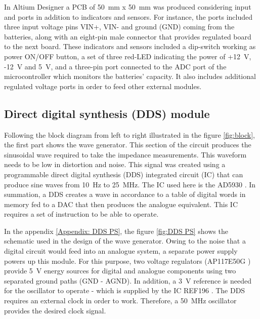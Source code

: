 In Altium Designer a PCB of \SI{50}{\milli\meter} x \SI{50}{\milli\meter} was produced considering input and ports in addition to indicators and sensors. For instance, the ports included three input voltage pins VIN+, VIN- and ground (GND) coming from the batteries, along with an eight-pin male connector that provides regulated board to the next board. These indicators and sensors included a dip-switch working as power ON/OFF button, a set of three red-LED indicating the power of +\SI{12}{\volt}, -\SI{12}{\volt} and \SI{5}{\volt}, and a three-pin port connected to the ADC port of the microcontroller which monitors the batteries' capacity. It also includes additional regulated voltage ports in order to feed other external modules.

\subsection{Direct digital synthesis (DDS) module}
\label{section DDS}
Following the block diagram from left to right illustrated in the figure \ref{fig:block}, the first part shows the wave generator. This section of the circuit produces the sinusoidal wave required to take the impedance measurements. This waveform needs to be low in distortion and noise. This signal was created using a programmable direct digital synthesis (DDS) integrated circuit (IC) that can produce sine waves from \SI{10}{\hertz} to \SI{25}{\mega\hertz}. The IC used here is the AD5930 \cite{ad:AD5930}. In summation, a DDS creates a wave in accordance to a table of digital words in memory fed to a DAC that then produces the analogue equivalent. This IC requires a set of instruction to be able to operate. 

In the appendix \ref{Appendix: DDS PS}, the figure \ref{fig:DDS PS} shows the schematic used in the design of the wave generator. Owing to the noise that a digital circuit would feed into an analogue system, a separate power supply powers up this module. For this purpose, two voltage regulators (AP117E50G \cite{diodes:AP117}) provide \SI{5}{\volt} energy sources for digital and analogue components using two separated ground paths (GND - AGND). In addition, a \SI{3}{\volt} reference is needed for the oscillator to operate - which is supplied by the IC REF196 \cite{ad:REF19x}. The DDS requires an external clock in order to work. Therefore, a \SI{50}{\mega\hertz} oscillator provides the desired clock signal.

